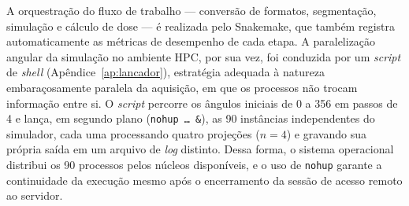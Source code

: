 %






A orquestração do fluxo de trabalho --- conversão de formatos, segmentação,
simulação e cálculo de dose --- é realizada pelo Snakemake, que também registra
automaticamente as métricas de desempenho de cada etapa. A paralelização angular
da simulação no ambiente HPC, por sua vez, foi conduzida por um \textit{script}
de \textit{shell} (Apêndice~\ref{ap:lancador}), estratégia adequada à natureza
embaraçosamente paralela da aquisição, em que os processos não trocam informação
entre si. O \textit{script} percorre os ângulos iniciais de 0 a 356 em passos de
4 e lança, em segundo plano (\texttt{nohup \dots\ \&}), as 90 instâncias
independentes do simulador, cada uma processando quatro projeções ($n=4$) e
gravando sua própria saída em um arquivo de \textit{log} distinto. Dessa forma,
o sistema operacional distribui os 90 processos pelos núcleos disponíveis, e o
uso de \texttt{nohup} garante a continuidade da execução mesmo após o
encerramento da sessão de acesso remoto ao servidor.


